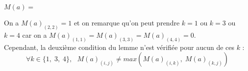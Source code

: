 \documentclass{report}
\begin{document}
\begin{center}
$M(a)=$
\end{center}

On a $M(a)_{(2,2)} = 1$ et on remarque qu'on peut prendre $k=1$ ou $k= 3$ ou $k=4$ car on a $M(a)_{(1,1)} = M(a)_{(3,3)} = M(a)_{(4,4)} = 0$.\\
Cependant, la deuxième condition du lemme n'est vérifiée pour aucun de ces $k$ : 
\[\forall k \in \{1,\; 3,\; 4\},\ \ \ M(a)_{(i,j)} \neq max(M(a)_{(i,k)}, \; M(a)_{(k,j)})\]
\end{document}
